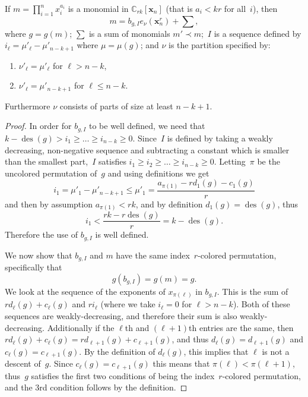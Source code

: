 \documentclass[ALCO,ThmDefs,Unicode,epreuves]{cedram}
\DeclareMathOperator{\des}{des}
\begin{document}
\begin{lemm}

\label{OrderLem2}
If $m=\prod_{i=1}^n x_i^{a_i}$ is a monomial in $\mathbb{C}_{rk}[\mathbf{x}_n]$ \textup{(}that is $a_i<kr$ for all~$i$\textup{)}, then
\begin{equation}
m=b_{g,I}e_\nu(\mathbf{x}_n^r)+\sum,
\end{equation}
 where $g=g(m)$; $\sum$ is a sum of 
monomials $m'\prec m$;~$I$ is a sequence defined by $i_\ell=\mu'_{\ell}-\mu'_{n-k+1}$ where $\mu=\mu(g)$; and $\nu$ is the 
partition specified by:

	\begin{enumerate}

		\item $\nu'_\ell=\mu'_\ell$ for $\ell> n-k$,

		\item $\nu'_\ell=\mu'_{n-k+1}$ for $\ell\leq n-k$.
	
	\end{enumerate}

Furthermore $\nu$ consists of parts of size at least $n-k+1$.

	\begin{proof}
	
	In order for $b_{g,I}$ to be well defined, we need that $k-\des (g)>i_1\geq \ldots\geq i_{n-k}\geq 0$. Since~$I$ is defined 
by taking a weakly decreasing, non-negative sequence and subtracting a constant which is smaller than the smallest part,~$I$ satisfies $i_1\geq i_2\geq\ldots \geq i_{n-k}\geq 0$. Letting~$\pi$ be the uncolored permutation of~$g$ and using 
definitions we get
\begin{equation}
i_1=\mu'_1-\mu'_{n-k+1}\leq \mu'_1=\frac{a_{\pi(1)}-rd_1(g)-c_1(g)}{r}
\end{equation}
and 
then by assumption $a_{\pi(1)}<rk$, and by definition $d_1(g)=\des (g)$, thus
\begin{equation}
i_1< 
\frac{rk-r\des(g)}{r}=k-\des (g).
\end{equation}
 Therefore the use of $b_{g,I}$ is well defined.

	
	We now show that $b_{g,I}$ and $m$ have the same index~$r$-colored permutation, specifically that 
\begin{equation}
g(b_{g,I})=g(m)=g.
\end{equation}
 We look at the sequence of the exponents of $x_{\pi(\ell)}$ in 
$b_{g,I}$. This is the sum of $rd_\ell(g)+c_\ell(g)$ and $ri_\ell$ (where we take $i_\ell=0$ for $\ell>n-k$). Both of 
these sequences are weakly-decreasing, and therefore their sum is also weakly-decreasing. Additionally if the $\ell$th and 
$(\ell+1)$th entries are the same, then $rd_\ell(g)+c_\ell(g)=rd_{\ell+1}(g)+c_{\ell+1}(g)$, and thus 
$d_\ell(g)=d_{\ell+1}(g)$ and $c_\ell(g)=c_{\ell+1}(g)$. By the definition of $d_\ell(g)$, this implies that $\ell$ is not 
a descent of~$g$. Since $c_\ell(g)=c_{\ell+1}(g)$ this means that $\pi(\ell)<\pi(\ell+1)$, thus~$g$ satisfies the first 
two conditions of being the index~$r$-colored permutation, and the 3rd condition follows by the definition.




\end{proof}
\end{lemm}
\end{document}
